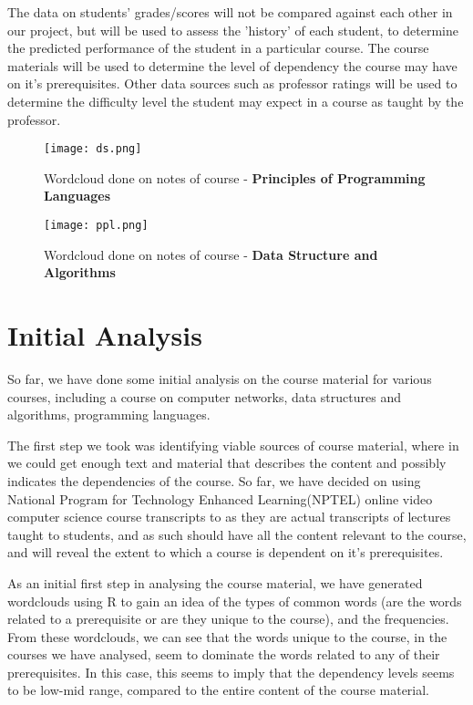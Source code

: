 \documentclass[conference]{IEEEtran}
\begin{document}
The data on students' grades/scores will not be compared against each other in our project, but will be used to assess the 'history' of each student, to determine the predicted performance of the student in a particular course. The course materials will be used to determine the level of dependency the course may have on it's prerequisites. Other data sources such as professor ratings will be used to determine the difficulty level the student may expect in a course as taught by the 
professor.
\begin{figure}
	\texttt{[image: ds.png]}
	\caption{Wordcloud done on notes of course - \textbf{Principles of Programming Languages}}
	\label{fig:ppl}
\end{figure}	
\begin{figure}
	\texttt{[image: ppl.png]}
	\caption{Wordcloud done on notes of course -\textbf{ Data Structure and Algorithms} }
	\label{fig:ds}
\end{figure}	
	\section{Initial Analysis}
So far, we have done some initial analysis on the course material for various courses, including a course on computer networks, data structures and algorithms, programming languages.

The first step we took was identifying viable sources of course material, where in we could get enough text and material that describes the content and possibly indicates the dependencies of the course. So far, we have decided on using National Program for Technology Enhanced Learning(NPTEL)\cite{nptel} online video computer science course transcripts to as they are actual transcripts of lectures taught to students, and as such should have all the content relevant to the course, and will reveal the extent to which a course is dependent on it's prerequisites.

As an initial first step in analysing the course material, we have generated wordclouds using R\cite{r} to gain an idea of the types of common words (are the words related to a prerequisite or are they unique to the course), and the frequencies. From these wordclouds, we can see that the words unique to the course, in the courses we have analysed, seem to dominate the words related to any of their prerequisites. In this case, this seems to imply that the dependency levels seems to be low-mid range, compared to the entire content of the course material.
\end{document}

